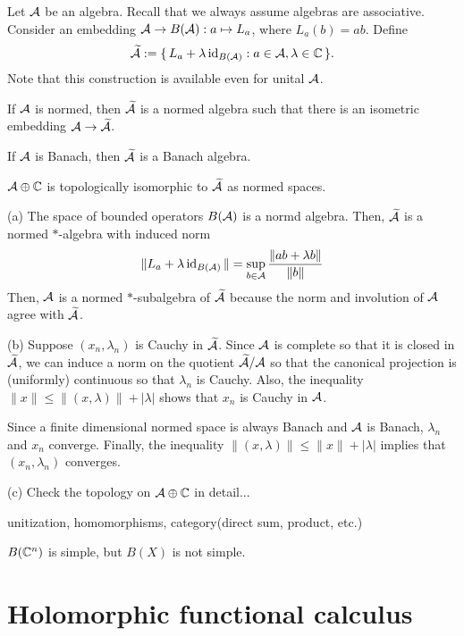 \documentclass{../../large}
\begin{document}
\begin{prb}[Unitization]
Let $\mathcal{A}$ be an algebra.
Recall that we always assume algebras are associative.
Consider an embedding $\mathcal{A}\to B(\mathcal{A}):a\mapsto L_a$, where $L_a(b)=ab$.
Define
\[\widetilde{\mathcal{A}}:=\{\,L_a+\lambda\operatorname{id}_{B(\mathcal{A})}:a\in\mathcal{A},\lambda\in\mathbb{C}\,\}.\]
Note that this construction is available even for unital $\mathcal{A}$.
\begin{parts}
\item If $\mathcal{A}$ is normed, then $\widetilde{\mathcal{A}}$ is a normed algebra such that there is an isometric embedding $\mathcal{A}\to\widetilde{\mathcal{A}}$.
\item If $\mathcal{A}$ is Banach, then $\widetilde{\mathcal{A}}$ is a Banach algebra.
\item $\mathcal{A}\oplus\mathbb{C}$ is topologically isomorphic to $\widetilde{\mathcal{A}}$ as normed spaces.
\end{parts}
\end{prb}
\begin{pf}
(a)
The space of bounded operators $B(\mathcal{A})$ is a normd algebra.
Then, $\widetilde{\mathcal{A}}$ is a normed $*$-algebra with induced norm
\[\|L_a+\lambda\operatorname{id}_{B(\mathcal{A})}\|=\sup_{b\in\mathcal{A}}\frac{\|ab+\lambda b\|}{\|b\|}\]
Then, $\mathcal{A}$ is a normed $*$-subalgebra of $\widetilde{\mathcal{A}}$ because the norm and involution of $\mathcal{A}$ agree with $\widetilde{\mathcal{A}}$.

(b)
Suppose $(x_n,\lambda_n)$ is Cauchy in $\widetilde{\mathcal{A}}$.
Since $\mathcal{A}$ is complete so that it is closed in $\widetilde{\mathcal{A}}$, we can induce a norm on the quotient $\widetilde{\mathcal{A}}/\mathcal{A}$ so that the canonical projection is (uniformly) continuous so that $\lambda_n$ is Cauchy.
Also, the inequality $\|x\|\le\|(x,\lambda)\|+|\lambda|$ shows that $x_n$ is Cauchy in $\mathcal{A}$.

Since a finite dimensional normed space is always Banach and $\mathcal{A}$ is Banach, $\lambda_n$ and $x_n$ converge.
Finally, the inequality $\|(x,\lambda)\|\le\|x\|+|\lambda|$ implies that $(x_n,\lambda_n)$ converges.

(c)
Check the topology on $\mathcal{A}\oplus\mathbb{C}$ in detail...
\end{pf}



unitization, homomorphisms, category(direct sum, product, etc.)

$B(\mathbb{C}^n)$ is simple, but $B(X)$ is not simple.



\section{Holomorphic functional calculus}
\end{document}
